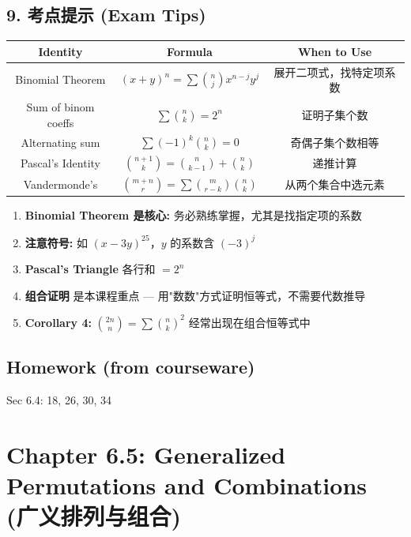 \documentclass[10pt,a4paper,openany]{ctexbook}
\theoremstyle{definition}
\theoremstyle{remark}
\begin{document}
\subsection{9. 考点提示 (Exam Tips)}

\begin{center}
\begin{tabular}{ccc}
\hline
Identity & Formula & When to Use \\ \hline
Binomial Theorem & $(x+y)^n = \sum \binom{n}{j} x^{n-j}y^j$ & 展开二项式，找特定项系数 \\
Sum of binom coeffs & $\sum \binom{n}{k} = 2^n$ & 证明子集个数 \\
Alternating sum & $\sum (-1)^k \binom{n}{k} = 0$ & 奇偶子集个数相等 \\
Pascal's Identity & $\binom{n+1}{k} = \binom{n}{k-1} + \binom{n}{k}$ & 递推计算 \\
Vandermonde's & $\binom{m+n}{r} = \sum \binom{m}{r-k} \binom{n}{k}$ & 从两个集合中选元素 \\
\hline
\end{tabular}

\end{center}

\begin{enumerate}
\item \textbf{Binomial Theorem 是核心:} 务必熟练掌握，尤其是找指定项的系数
\item \textbf{注意符号:} 如 $(x - 3y)^{25}$，$y$ 的系数含 $(-3)^j$
\item \textbf{Pascal's Triangle} 各行和 $= 2^n$
\item \textbf{组合证明} 是本课程重点 — 用"数数"方式证明恒等式，不需要代数推导
\item \textbf{Corollary 4:} $\binom{2n}{n} = \sum \binom{n}{k}^2$ 经常出现在组合恒等式中

\end{enumerate}

\vspace{-2pt}

\subsection{Homework (from courseware)}

Sec 6.4: 18, 26, 30, 34


\section{Chapter 6.5: Generalized Permutations and Combinations (广义排列与组合)}
\end{document}
